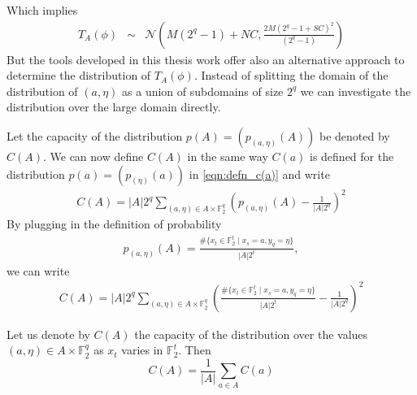 Which implies
\begin{eqnarray}
T_{A}(\phi) &\sim & \mathcal{N}\left(M(2^q-1)+NC,\frac{2M(2^q -1 +SC)^2}{(2^q -1)}\right)
\end{eqnarray}But the tools developed in this thesis work offer also an alternative approach to determine the distribution of $T_{A}(\phi)$. Instead of splitting the domain of the distribution of $(a,\eta)$ as a union of subdomains of size $2^q$ we can investigate the distribution over the large domain directly. 
\par \noindent Let the capacity of the distribution $p\left(A\right) = \left( p_{\left(a,\eta \right)} \left(A\right) \right)$ be denoted by $C\left(A\right)$. We can now define $C\left(A\right)$ in the same way $C\left(a\right)$ is defined for the distribution $p\left(a\right) = \left( p_{\left(\eta \right)} \left(a\right) \right)$ in \ref{eqn:defn_c(a)} and write
\begin{eqnarray*}
C\left(A\right) = |A|2^q\displaystyle\sum_{\left(a,\eta \right) \in A \times \mathbb{F}_2^q} \left( p_{\left(a,\eta \right)}\left(A\right) - \frac{1}{|A|2^q} \right)^2
\end{eqnarray*}
By plugging in the definition of probability
\begin{eqnarray*}
p_{\left(a,\eta \right)}\left(A\right) = \frac{\#\lbrace x_t \in \mathbb{F}_{2}^{t}\;|\;x_s = a,y_q=\eta \rbrace}{|A|2^t},
\end{eqnarray*} we can write 
\begin{eqnarray}
C\left(A\right) = |A|2^q\displaystyle\sum_{\left(a,\eta \right) \in A \times \mathbb{F}_2^q} \left( \frac{\#\lbrace x_t \in \mathbb{F}_{2}^{t}\;|\;x_s = a,y_q=\eta \rbrace}{|A|2^t} - \frac{1}{|A|2^q} \right)^2 \label{eqn:C(A)_elaborate}
\end{eqnarray}
\begin{lemma} \label{lemma:C(A)} Let us denote by $C(A)$ the capacity of the distribution over the values 
$(a,\eta) \in A \times \mathbb{F}_{2}^{q}$ as $x_t$ varies in $\mathbb{F}_{2}^{t}$. Then 
$$C(A)=\frac{1}{|A|}\displaystyle\sum_{a \in A}C(a)$$
\end{lemma}
